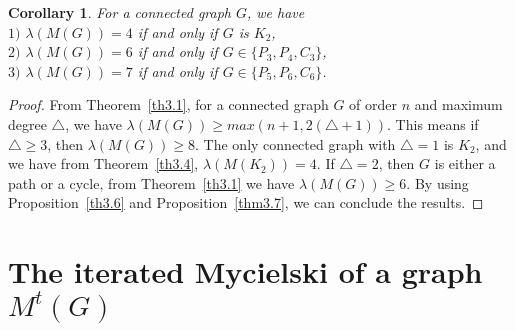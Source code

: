 \documentclass{article}
\newtheorem{cor} {Corollary}
\newtheorem{open problem} {Open Problem}
\numberwithin{lemma}{section}
\numberwithin{theorem}{section}
\numberwithin{cor}{section}
\numberwithin{prop}{section}
\numberwithin{con}{section}
\numberwithin{claim}{section}
\numberwithin{obs}{section}
\numberwithin{dnt}{section}
\begin{document}
\begin{cor}\label{cor3.6}
	For a connected graph $G$, we have\\
	 $1)$	$\lambda(M(G))=4$   if and only if  $G$ is $K_2$,\\ 
	 $2)$	$\lambda(M(G))=6$   if and only if  $G \in \{ P_3, P_4, C_3  \}$,\\
	$3)$	$\lambda(M(G))=7$   if and only if  $G \in \{ P_5, P_6, C_6  \}$.	
\end{cor}
\begin{proof}
	From Theorem~\ref{th3.1}, for a connected graph $G$ of order $n$ and maximum degree $\bigtriangleup$, we have $\lambda(M(G)) \geq max(n+1,2(\bigtriangleup+1))$. This means if $\bigtriangleup\geq 3$, then $\lambda(M(G))\geq 8$. The only connected graph with $\bigtriangleup=1$ is $K_2$, and we have from Theorem~\ref{th3.4},  $\lambda(M(K_2))=4$. If $\bigtriangleup=2$, then $G$ is either a path or a cycle, from Theorem~\ref{th3.1}  we have $\lambda(M(G))\geq 6$. By using Proposition~\ref{th3.6} and Proposition~\ref{thm3.7}, we can conclude the results.
\end{proof}

\section{The iterated Mycielski of a graph $M^t(G)$}\label{sec4}
\end{document}
